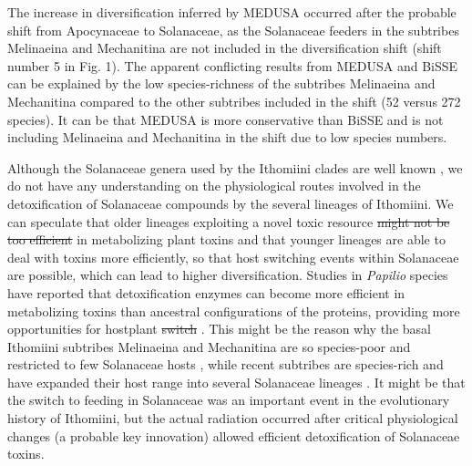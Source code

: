 \documentclass[10pt,letterpaper]{article} %
\providecommand{\DIFadd}[1]{{\protect\color{blue}\uwave{#1}}} %
\providecommand{\DIFdel}[1]{{\protect\color{red}\sout{#1}}}                      %
\providecommand{\DIFaddbegin}{} %
\providecommand{\DIFaddend}{} %
\providecommand{\DIFdelbegin}{} %
\providecommand{\DIFdelend}{} %
\begin{document}
The increase in diversification \DIFaddbegin \DIFadd{rate }\DIFaddend inferred by MEDUSA occurred after the
probable shift from Apocynaceae to Solanaceae, as the Solanaceae feeders
in the subtribes Melinaeina and Mechanitina are not included in the
diversification shift (shift number 5 in Fig. 1). The apparent
conflicting results from MEDUSA and BiSSE can be explained by the low
species-richness of the subtribes Melinaeina and Mechanitina compared to
the other subtribes included in the shift (52 versus 272 species). It
can be that MEDUSA is more conservative than BiSSE and is not including
Melinaeina and Mechanitina in the shift due to low species numbers.

Although the Solanaceae genera used by the Ithomiini clades are well
known \cite{willmott2006}, we do not have any understanding on the physiological
routes involved in the detoxification of Solanaceae compounds by the
several lineages of Ithomiini. We can speculate that older lineages
exploiting a novel toxic resource \cite{willmott2006, wahlberg2009} 
\DIFdelbegin \DIFdel{might not be too efficient
}\DIFdelend \DIFaddbegin \DIFadd{may be inefficient
}\DIFaddend in metabolizing plant toxins and that younger lineages are able to deal
with toxins more efficiently, so that host switching events within
Solanaceae are possible, which can lead to higher diversification.
Studies in \emph{Papilio} species have reported that detoxification
enzymes can become more efficient in metabolizing toxins than ancestral
configurations of the proteins, providing more opportunities for
hostplant \DIFdelbegin \DIFdel{switch }\DIFdelend \DIFaddbegin \DIFadd{switches }\DIFaddend \cite{li2003}. This might be the reason why the basal
Ithomiini subtribes Melinaeina and Mechanitina are so species-poor and
restricted to few Solanaceae hosts \cite{willmott2006}, while recent subtribes are
species-rich and have expanded their host range into several Solanaceae
lineages \cite{willmott2006}. It might be that the switch to feeding in Solanaceae
was an important event in the evolutionary history of Ithomiini, but the
actual radiation occurred after critical physiological changes (a
probable key innovation) allowed efficient detoxification of Solanaceae
toxins.
\end{document}
